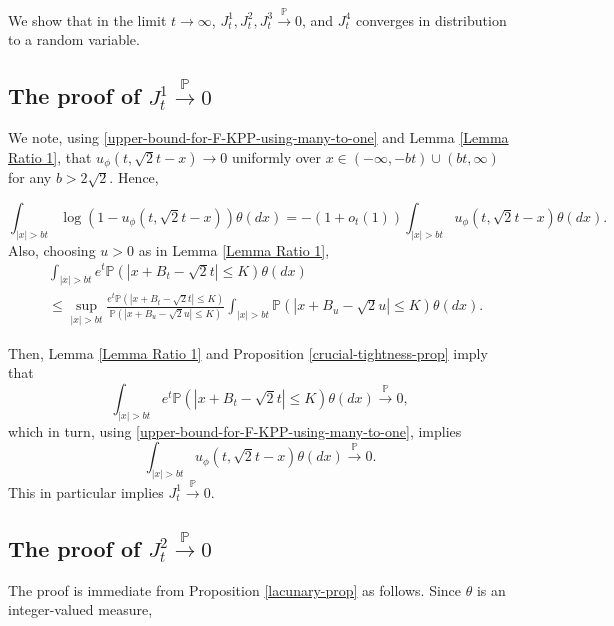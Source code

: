 \documentclass[a4paper,reqno]{amsart}%
\newcommand{\1}{\mathbf 1}
\theoremstyle{mine}
\numberwithin{theorem}{section}
\numberwithin{equation}{section}
\theoremstyle{remark}
\begin{document}
We show that in the limit $t \to \infty$,  $J_t^1, J_t^2, J_t^3 \overset{\mathbb{P}}{\to} 0 $, and $J_t^4$ converges in distribution to a random variable. \\
\subsection{The proof of $J_t^1 \overset{\mathbb{P}}{\to} 0$}

We note, using \eqref{upper-bound-for-F-KPP-using-many-to-one} and Lemma \ref{Lemma Ratio 1}, that $u_\phi(t, \sqrt{2}t -x) \to 0 $ uniformly over $x \in (-\infty, -bt) \cup (bt, \infty)$ for any $b> 2 \sqrt{2}$. Hence, 

\begin{equation}
\int_{|x| >bt}\log(1- u_\phi(t, \sqrt{2} t -x))\theta(dx) = -(1+ o_t(1)) \int_{|x| >bt}u_\phi(t, \sqrt{2} t -x)\theta(dx).
\end{equation}
Also, choosing $u>0$ as in Lemma \ref{Lemma Ratio 1},
\begin{align}\label{reuse-of-B-tightness}
    &\int_{|x| > bt}e^t \mathbb{P}(| x+ B_t - \sqrt{2} t| \leq K) \theta(dx)\\ \nonumber& \leq \sup_{|x| >bt} \frac{e^t \mathbb{P}(|x+ B_t - \sqrt{2} t| \leq K)}{\mathbb{P}(|x+ B_u - \sqrt{2} u| \leq K)} \int_{|x| >bt}\mathbb{P}(|x+ B_u - \sqrt{2} u| \leq K) \theta(dx).
\end{align}

Then, Lemma \ref{Lemma Ratio 1} and Proposition \ref{crucial-tightness-prop} imply that 
\begin{equation}\label{larger-than-bt-does-not-contribute}
     \int_{|x| > bt} e^t \mathbb{P}(| x+ B_t - \sqrt{2} t| \leq K) \theta(dx) \overset{\mathbb{P}}{\to} 0,
\end{equation}
which in turn, using \eqref{upper-bound-for-F-KPP-using-many-to-one}, implies 
\begin{equation}
    \int_{|x| > bt} u_\phi(t, \sqrt{2}t -x) \theta(dx) \overset{\mathbb{P}}{\to} 0.
\end{equation}
This in particular implies $J_t^1 \overset{\mathbb{P}}{\to} 0$.

\subsection{The proof of $J_t^2 \overset{\mathbb{P}}{\to} 0$} The proof is immediate from Proposition \ref{lacunary-prop} as follows. Since $\theta$ is an integer-valued measure, 
\end{document}
